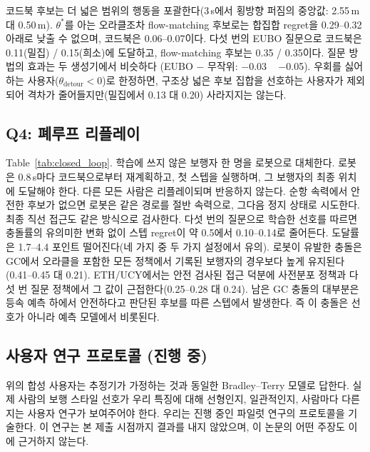 코드북 후보는 더 넓은 범위의 행동을 포괄한다(3\,s에서 횡방향 퍼짐의 중앙값: 2.55\,m 대 0.50\,m). $\theta^\ast$를 아는
오라클조차 flow-matching 후보로는 합집합 regret을 0.29--0.32 아래로 낮출 수 없으며, 코드북은 0.06--0.07이다. 다섯 번의 EUBO
질문으로 코드북은 0.11(밀집) / 0.15(희소)에 도달하고, flow-matching 후보는 0.35 / 0.35이다. 질문 방법의 효과는 두 생성기에서 비슷하다
(EUBO $-$ 무작위: $-$0.03 ~ $-$0.05). 우회를 싫어하는 사용자($\theta_{\text{detour}}<0$)로 한정하면, 구조상 넓은 후보 집합을 선호하는
사용자가 제외되어 격차가 줄어들지만(밀집에서 0.13 대 0.20) 사라지지는 않는다.



\subsection{Q4: 폐루프 리플레이}
Table~\ref{tab:closed_loop}. 학습에 쓰지 않은 보행자 한 명을 로봇으로 대체한다. 로봇은 0.8\,s마다 코드북으로부터 재계획하고,
첫 스텝을 실행하며, 그 보행자의 최종 위치에 도달해야 한다. 다른 모든 사람은 리플레이되며 반응하지 않는다. 순항 속력에서 안전한 후보가
없으면 로봇은 같은 경로를 절반 속력으로, 그다음 정지 상태로 시도한다. 최종 직선 접근도 같은 방식으로 검사한다.
다섯 번의 질문으로 학습한 선호를 따르면 충돌률의 유의미한 변화 없이 스텝 regret이 약 0.5에서 0.10--0.14로 줄어든다.
도달률은 1.7--4.4 포인트 떨어진다(네 가지 중 두 가지 설정에서 유의).
로봇이 유발한 충돌은 GC에서 오라클을 포함한 모든 정책에서 기록된 보행자의 경우보다 높게 유지된다(0.41--0.45 대 0.21).
ETH/UCY에서는 안전 검사된 접근 덕분에 사전분포 정책과 다섯 번 질문 정책에서 그 값이 근접한다(0.25--0.28 대 0.24). 남은 GC 충돌의 대부분은
등속 예측 하에서 안전하다고 판단된 후보를 따른 스텝에서 발생한다. 즉 이 충돌은 선호가 아니라 예측 모델에서 비롯된다.



\subsection{사용자 연구 프로토콜 (진행 중)}
\label{sec:pilot}

위의 합성 사용자는 추정기가 가정하는 것과 동일한 Bradley--Terry 모델로 답한다. 실제 사람의 보행 스타일
선호가 우리 특징에 대해 선형인지, 일관적인지, 사람마다 다른지는 사용자 연구가 보여주어야 한다. 우리는
진행 중인 파일럿 연구의 프로토콜을 기술한다. 이 연구는 본 제출 시점까지 결과를 내지 않았으며, 이 논문의 어떤 주장도 이에 근거하지 않는다.

